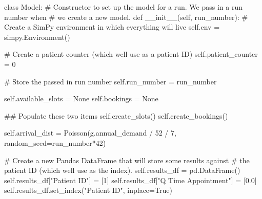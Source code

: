 \documentclass[
  letterpaper,
  DIV=11,
  numbers=noendperiod]{scrreprt}
\newenvironment{Shaded}{\begin{snugshade}}{\end{snugshade}}
\newcommand{\CommentTok}[1]{\textcolor[rgb]{0.37,0.37,0.37}{#1}}
\newcommand{\DecValTok}[1]{\textcolor[rgb]{0.68,0.00,0.00}{#1}}
\newcommand{\FloatTok}[1]{\textcolor[rgb]{0.68,0.00,0.00}{#1}}
\newcommand{\FunctionTok}[1]{\textcolor[rgb]{0.28,0.35,0.67}{#1}}
\newcommand{\KeywordTok}[1]{\textcolor[rgb]{0.00,0.23,0.31}{#1}}
\newcommand{\NormalTok}[1]{\textcolor[rgb]{0.00,0.23,0.31}{#1}}
\newcommand{\OperatorTok}[1]{\textcolor[rgb]{0.37,0.37,0.37}{#1}}
\newcommand{\StringTok}[1]{\textcolor[rgb]{0.13,0.47,0.30}{#1}}
\newcommand{\VariableTok}[1]{\textcolor[rgb]{0.07,0.07,0.07}{#1}}
\newcommand*\circled[1]{\tikz[baseline=(char.base)]{
          \node[shape=circle,draw,inner sep=1pt] (char) {{\scriptsize#1}};}}
\begin{document}
\label{annotated-cell-171}%
\begin{Shaded}
\begin{Highlighting}[]
\KeywordTok{class}\NormalTok{ Model:}
    \CommentTok{\# Constructor to set up the model for a run.  We pass in a run number when}
    \CommentTok{\# we create a new model.}
    \KeywordTok{def} \FunctionTok{\_\_init\_\_}\NormalTok{(}\VariableTok{self}\NormalTok{, run\_number):}
        \CommentTok{\# Create a SimPy environment in which everything will live}
        \VariableTok{self}\NormalTok{.env }\OperatorTok{=}\NormalTok{ simpy.Environment()}

        \CommentTok{\# Create a patient counter (which we\textquotesingle{}ll use as a patient ID)}
        \VariableTok{self}\NormalTok{.patient\_counter }\OperatorTok{=} \DecValTok{0}

        \CommentTok{\# Store the passed in run number}
        \VariableTok{self}\NormalTok{.run\_number }\OperatorTok{=}\NormalTok{ run\_number}

        \VariableTok{self}\NormalTok{.available\_slots }\OperatorTok{=} \VariableTok{None}
        \VariableTok{self}\NormalTok{.bookings }\OperatorTok{=} \VariableTok{None}

        \CommentTok{\#\# Populate these two items}
        \VariableTok{self}\NormalTok{.create\_slots()}
        \VariableTok{self}\NormalTok{.create\_bookings()}

        \VariableTok{self}\NormalTok{.arrival\_dist }\OperatorTok{=}\NormalTok{ Poisson(g.annual\_demand }\OperatorTok{/} \DecValTok{52} \OperatorTok{/} \DecValTok{7}\NormalTok{, }\hspace*{\fill}\NormalTok{\circled{1}}
\NormalTok{                                    random\_seed}\OperatorTok{=}\NormalTok{run\_number}\OperatorTok{*}\DecValTok{42}\NormalTok{) }\hspace*{\fill}\NormalTok{\circled{2}}

        \CommentTok{\# Create a new Pandas DataFrame that will store some results against}
        \CommentTok{\# the patient ID (which we\textquotesingle{}ll use as the index).}
        \VariableTok{self}\NormalTok{.results\_df }\OperatorTok{=}\NormalTok{ pd.DataFrame()}
        \VariableTok{self}\NormalTok{.results\_df[}\StringTok{"Patient ID"}\NormalTok{] }\OperatorTok{=}\NormalTok{ [}\DecValTok{1}\NormalTok{]}
        \VariableTok{self}\NormalTok{.results\_df[}\StringTok{"Q Time Appointment"}\NormalTok{] }\OperatorTok{=}\NormalTok{ [}\FloatTok{0.0}\NormalTok{]}
        \VariableTok{self}\NormalTok{.results\_df.set\_index(}\StringTok{"Patient ID"}\NormalTok{, inplace}\OperatorTok{=}\VariableTok{True}\NormalTok{)}


\end{Highlighting}
\end{Shaded}
\end{document}
